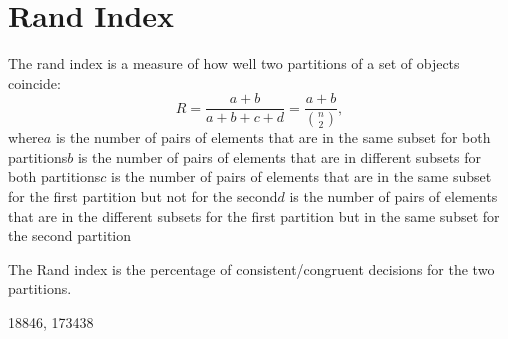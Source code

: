 \documentclass[letterpaper,10pt,english]{jupyterBook}
\begin{document}
\section{Rand Index}
\label{\detokenize{Text_Clustering:rand-index}}
\sphinxAtStartPar
The rand index is a measure of how well two partitions of a set of objects coincide:
\begin{equation*}
R=\frac{a + b}{a + b + c + d} = \frac{a + b}{{n \choose2}},
\end{equation*}
\sphinxAtStartPar
where\(a\) is the number of pairs of elements that are in the same subset for both partitions\(b\) is the number of pairs of elements that are in different subsets for both partitions\(c\) is the number of pairs of elements that are in the same subset for the first partition but not for the second\(d\) is the number of pairs of elements that are in the different subsets for the first partition but in the same subset for the second partition

\sphinxAtStartPar
The Rand index is the percentage of consistent/congruent decisions for the two partitions.

\begin{sphinxVerbatim}[commandchars=\\\{\}]
     
  

\PYG{p}{[}\PYG{p}{]}\PYG{p}{[}\PYG{p}{]}
\end{sphinxVerbatim}

\begin{sphinxVerbatim}[commandchars=\\\{\}]
18846, 173438
\end{sphinxVerbatim}
\end{document}
